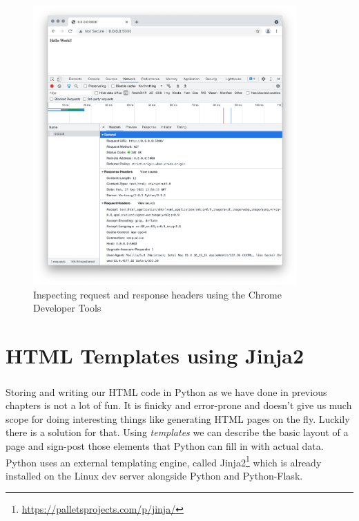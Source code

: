\documentclass[12pt, a4paper, oneside]{book}
\begin{document}
{\begin{figure}[H]
\centering
\includegraphics[width=0.9\textwidth]{images/chrome-header-inspection}
\caption{Inspecting request and response headers using the Chrome Developer Tools}
\label{fig:chrome-header-inspection}
\end{figure}




\chapter{HTML Templates using Jinja2}
\label{style}
\paragraph{} Storing and writing our HTML code in Python as we have done in previous chapters is not a lot of fun. It is finicky and error-prone and doesn't give us much scope for doing interesting things like generating HTML pages on the fly. Luckily there is a solution for that. Using \emph{templates} we can describe the basic layout of a page and sign-post those elements that Python can fill in with actual data. Python uses an external templating engine, called Jinja2\footnote{\url{https://palletsprojects.com/p/jinja/}} which is already installed on the Linux dev server alongside Python and Python-Flask.

}
\end{document}
